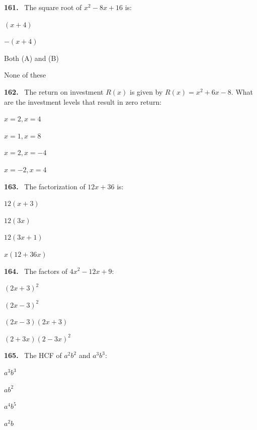 \documentclass[11pt]{article}
\newenvironment{qenv}[1]{%
  \par\medskip\noindent\textbf{#1.}\ \ignorespaces
}{\par}
\begin{document}
\begin{qenv}{161} The square root of $x^2-8x+16$ is:
\begin{options} \item $(x+4)$ \item $-(x+4)$ \item Both (A) and (B) \item None of these \end{options} \end{qenv}

\begin{qenv}{162} The return on investment $R(x)$ is given by $R(x)=x^2+6x-8$. What are the investment levels that result in zero return:
\begin{options} \item $x=2, x=4$ \item $x=1, x=8$ \item $x=2, x=-4$ \item $x=-2, x=4$ \end{options} \end{qenv}

\begin{qenv}{163} The factorization of $12x+36$ is:
\begin{options} \item $12(x+3)$ \item $12(3x)$ \item $12(3x+1)$ \item $x(12+36x)$ \end{options} \end{qenv}

\begin{qenv}{164} The factors of $4x^2-12x+9$:
\begin{options} \item $(2x+3)^2$ \item $(2x-3)^2$ \item $(2x-3)(2x+3)$ \item $(2+3x)(2-3x)^2$ \end{options} \end{qenv}

\begin{qenv}{165} The HCF of $a^2b^2$ and $a^3b^3$:
\begin{options} \item $a^3b^3$ \item $ab^2$ \item $a^4b^5$ \item $a^2b$ \end{options} \end{qenv}
\end{document}
